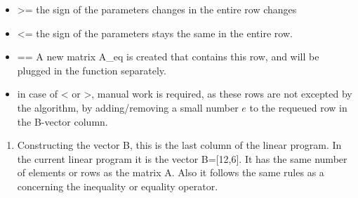 \documentclass[11pt]{article}
\providecommand{\tightlist}{%
      \setlength{\itemsep}{0pt}\setlength{\parskip}{0pt}}
\begin{document}
\begin{itemize}
\tightlist
\item
  \textgreater= the sign of the parameters changes in the entire row
  changes
\item
  \textless= the sign of the parameters stays the same in the entire
  row.
\item
  == A new matrix A\_eq is created that contains this row, and will be
  plugged in the function separately.
\item
  in case of \textless{} or \textgreater, manual work is required, as
  these rows are not excepted by the algorithm, by adding/removing a
  small number \(e\) to the requeued row in the B-vector column.
\end{itemize}

\begin{enumerate}
\def\labelenumi{\arabic{enumi}.}
\setcounter{enumi}{3}
\tightlist
\item
  Constructing the vector B, this is the last column of the linear
  program. In the current linear program it is the vector B={[}12,6{]}.
  It has the same number of elements or rows as the matrix A. Also it
  follows the same rules as a concerning the inequality or equality
  operator.
\end{enumerate}

\newpage
\end{document}
